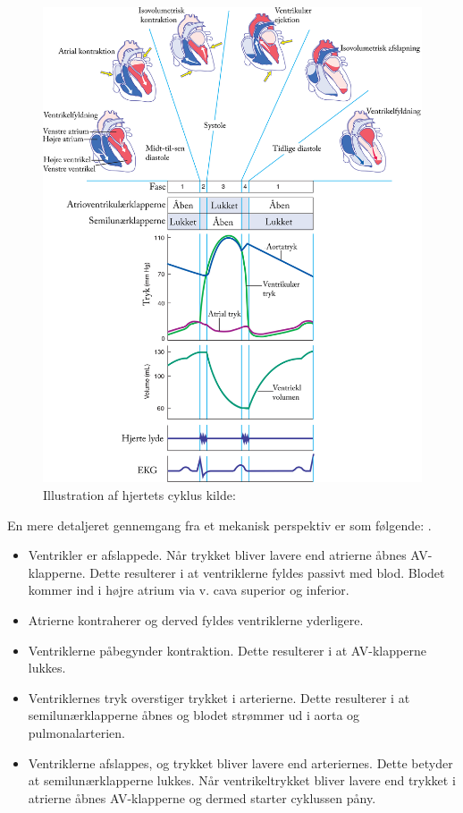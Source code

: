 \begin{figure}[H] %
\begin{center}
\includegraphics[width=1\textwidth]{figures/cyklus}
\end{center}
\caption{Illustration af hjertets cyklus kilde: \cite{cindy}}
\label{fig:hjerte_cyklus}
\end{figure}


En mere detaljeret gennemgang fra et mekanisk perspektiv er som følgende: \cite{gronanatomi}.


\begin{itemize}
\item Ventrikler er afslappede. Når trykket bliver lavere end atrierne åbnes AV-klapperne. Dette resulterer i at ventriklerne fyldes passivt med blod. Blodet kommer ind i højre atrium via v. cava superior og inferior.
\item Atrierne kontraherer og derved fyldes ventriklerne yderligere.
\item Ventriklerne påbegynder kontraktion. Dette resulterer i at AV-klapperne lukkes.
\item Ventriklernes tryk overstiger trykket i arterierne. Dette resulterer i at semilunærklapperne åbnes og blodet strømmer ud i aorta og pulmonalarterien.
\item Ventriklerne afslappes, og trykket bliver lavere end arteriernes. Dette betyder at semilunærklapperne lukkes. Når ventrikeltrykket bliver lavere end trykket i atrierne åbnes AV-klapperne og dermed starter cyklussen påny.
\end{itemize}



